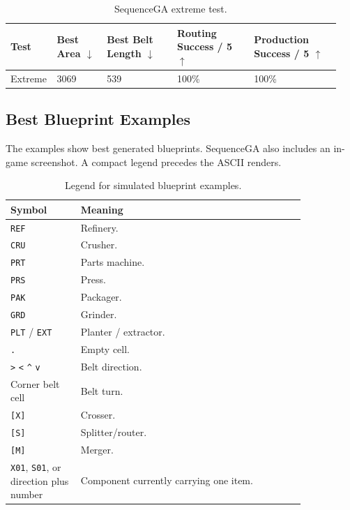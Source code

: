 \documentclass[11pt,a4paper]{article}
\begin{document}
\begin{table}[H]
    \centering
    \caption{SequenceGA extreme test.}
    \label{tab:sequencega-extreme}
    \setlength{\tabcolsep}{2pt}
    \begin{tabular}{@{}L{0.09\linewidth} L{0.15\linewidth} L{0.21\linewidth} L{0.23\linewidth} L{0.26\linewidth}@{}}
        \toprule
        Test & Best Area $\downarrow$ & Best Belt Length $\downarrow$ & Routing Success / 5 $\uparrow$ & Production Success / 5 $\uparrow$ \\
        \midrule
        Extreme & 3069 & 539 & 100\% & 100\% \\
        \bottomrule
    \end{tabular}
\end{table}

\subsection{Best Blueprint Examples}

The examples show best generated blueprints. SequenceGA also includes an in-game screenshot. A compact legend precedes the ASCII renders.

\begin{table}[H]
    \centering
    \caption{Legend for simulated blueprint examples.}
    \label{tab:blueprint-legend}
    \begin{tabular}{L{0.20\linewidth} L{0.64\linewidth}}
        \toprule
        Symbol & Meaning \\
        \midrule
        \texttt{REF} & Refinery. \\
        \texttt{CRU} & Crusher. \\
        \texttt{PRT} & Parts machine. \\
        \texttt{PRS} & Press. \\
        \texttt{PAK} & Packager. \\
        \texttt{GRD} & Grinder. \\
        \texttt{PLT} / \texttt{EXT} & Planter / extractor. \\
        \texttt{.} & Empty cell. \\
        \texttt{>} \texttt{<} \texttt{\textasciicircum} \texttt{v} & Belt direction. \\
        Corner belt cell & Belt turn. \\
        \texttt{[X]} & Crosser. \\
        \texttt{[S]} & Splitter/router. \\
        \texttt{[M]} & Merger. \\
        \texttt{X01}, \texttt{S01}, or direction plus number & Component currently carrying one item. \\
        \bottomrule
    \end{tabular}
\end{table}
\end{document}
